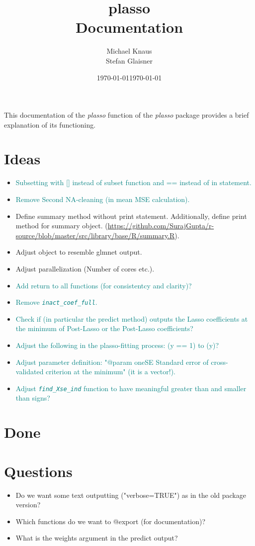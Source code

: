 \documentclass[12pt]{article}
\title{\vspace{-2cm} plasso \\ Documentation}
\author{Michael Knaus \\ Stefan Glaisner}
\date{\today}
\date{\today}
\begin{document}
\maketitle

This documentation of the \emph{plasso} function of the \emph{plasso} package provides a brief explanation of its functioning.

\section{Ideas}

\begin{itemize}
    \item \textcolor{teal}{Subsetting with [] instead of subset function and == instead of in statement.}
    \item \textcolor{teal}{Remove Second NA-cleaning (in mean MSE calculation).}
    \item Define summary method without print statement. Additionally, define print method for summary object. (\url{https://github.com/SurajGupta/r-source/blob/master/src/library/base/R/summary.R}).
    \item Adjust object to resemble glmnet output.
    \item Adjust parallelization (Number of cores etc.).
    \item \textcolor{teal}{Add return to all functions (for consistentcy and clarity)?}
    \item \textcolor{teal}{Remove \emph{\texttt{inact\_coef\_full}}.}
    \item \textcolor{teal}{Check if (in particular the predict method) outputs the Lasso coefficients at the minimum of Post-Lasso or the Post-Lasso coefficients?}
    \item \textcolor{teal}{Adjust the following in the plasso-fitting process: (y == 1) to (y)?}
    \item \textcolor{teal}{Adjust parameter definition: "@param oneSE Standard error of cross-validated criterion at the minimum" (it is a vector!).}
    \item \textcolor{teal}{Adjust \emph{\texttt{find\_Xse\_ind}} function to have meaningful greater than and smaller than signs?}
\end{itemize}


\section{Done}


\section{Questions}

\begin{itemize}
    \item Do we want some text outputting ("verbose=TRUE") as in the old package version?
    \item Which functions do we want to @export (for documentation)?
    \item What is the weights argument in the predict output?
\end{itemize}
\end{document}
